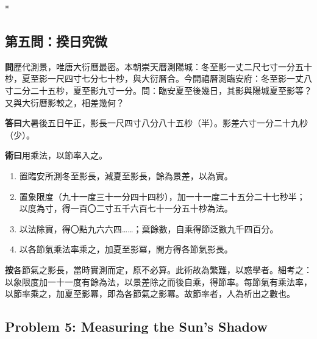 \documentclass[11pt,a4paper]{article}
\newcommand{\WenCN}{\textbf{\color{headcolor}問}}
\newcommand{\DaCN}{\textbf{\color{headcolor}答曰}}
\newcommand{\ShuCN}{\textbf{\color{headcolor}術曰}}
\newcommand{\AnCN}{\textbf{\color{headcolor}按}}
\begin{document}
\newpage

\switchcolumn[0]*
\subsection*{第五問：揆日究微}

\vspace{0.5em}
\WenCN{}\quad 歷代測景，唯唐大衍曆最密。本朝崇天曆測陽城：冬至影一丈二尺七寸一分五十杪，夏至影一尺四寸七分七十杪，與大衍曆合。今開禧曆測臨安府：冬至影一丈八寸二分二十五杪，夏至影九寸一分。問：臨安夏至後幾日，其影與陽城夏至影等？又與大衍曆影較之，相差幾何？

\vspace{0.5em}
\DaCN{}\quad 大暑後五日午正，影長一尺四寸八分八十五杪（半）。影差六寸一分二十九杪（少）。

\vspace{0.5em}
\ShuCN{}\quad 用乘法，以節率入之。
\begin{enumerate}[noitemsep,topsep=0pt]
  \item 置臨安所測冬至影長，減夏至影長，餘為景差，以為實。
  \item 置象限度（九十一度三十一分四十四杪），加一十一度二十五分二十七秒半；以度為寸，得一百〇二寸五千六百七十一分五十杪為法。
  \item 以法除實，得〇點九六六四……；棄餘數，自乘得節泛數九千四百分。
  \item 以各節氣乘法率乘之，加夏至影冪，開方得各節氣影長。
\end{enumerate}

\vspace{0.5em}
\AnCN{}\quad 各節氣之影長，當時實測而定，原不必算。此術故為繁難，以惑學者。細考之：以象限度加一十一度有餘為法，以景差除之而後自乘，得節率。每節氣有乘法率，以節率乘之，加夏至影冪，即為各節氣之影冪。故節率者，人為析出之數也。

\switchcolumn[1]
\subsection*{Problem 5: Measuring the Sun's Shadow}
\label{sec:kuirijiuwei}
\end{document}
